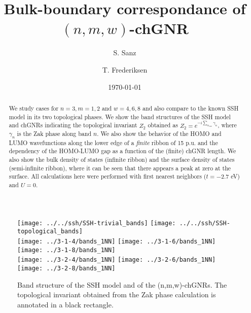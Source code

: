 \documentclass[amsmath,%
amssymb,prb,superscriptaddress]{revtex4}
\begin{document}
\title{Bulk-boundary correspondance of $(n,m,w)$-chGNR}

\author{S. Sanz}

\author{T. Frederiksen}

\date{\today}

\begin{abstract}
We study cases for $n=3, m=1, 2$ and $w=4,6,8$ and also compare to the known SSH model in its two topological phases. We show the band structures of the SSH model and chGNRs indicating the topological invariant $Z_{2}$ obtained as $Z_{2}=e^{-i\sum_{n_{occ}}\gamma_{n}}$, where $\gamma_{n}$ is the Zak phase along band $n$. We also show the behavior of the HOMO and LUMO wavefunctions along the lower edge of a \emph{finite} ribbon of 15 p.u. and the dependency of the HOMO-LUMO gap as a function of the (finite) chGNR length. We also show the bulk density of states (infinite ribbon) and the surface density of states (semi-infinite ribbon), where it can be seen that there appears a peak at zero at the surface. All calculations here were performed with first nearest neighbors ($t=-2.7$ eV) and $U=0$.
\end{abstract}


\maketitle

%
%

\begin{figure*}
	\texttt{[image: ../../ssh/SSH-trivial\_bands]}
	\texttt{[image: ../../ssh/SSH-topological\_bands]}\\
	\texttt{[image: ../3-1-4/bands\_1NN]}
	\texttt{[image: ../3-1-6/bands\_1NN]}
	\texttt{[image: ../3-1-8/bands\_1NN]}\\
	\texttt{[image: ../3-2-4/bands\_1NN]}
	\texttt{[image: ../3-2-6/bands\_1NN]}
	\texttt{[image: ../3-2-8/bands\_1NN]}
	\caption{Band structure of the SSH model and of the (n,m,w)-chGNRs. The topological invariant obtained from the Zak phase calculation is annotated in a black rectangle. }
\end{figure*}
\end{document}
